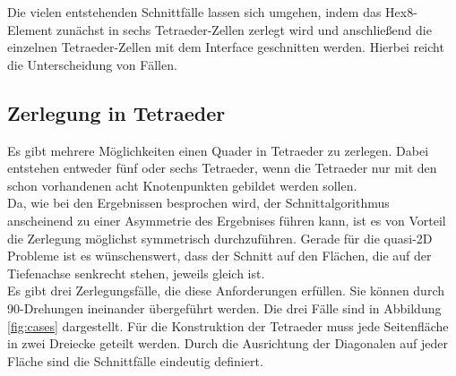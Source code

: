 Die vielen entstehenden Schnittfälle lassen sich umgehen, indem das Hex8-Element zunächst in sechs Tetraeder-Zellen zerlegt wird und anschließend die einzelnen Tetraeder-Zellen mit dem Interface geschnitten werden. Hierbei reicht die Unterscheidung von %
Fällen.

\subsection{Zerlegung in Tetraeder}
Es gibt mehrere Möglichkeiten einen Quader in Tetraeder zu zerlegen. Dabei entstehen entweder fünf oder sechs Tetraeder, wenn die Tetraeder nur mit den schon vorhandenen acht Knotenpunkten gebildet werden sollen.\\

Da, wie bei den Ergebnissen besprochen wird, der Schnittalgorithmus anscheinend zu einer Asymmetrie des Ergebnises führen kann, ist es von Vorteil die Zerlegung möglichst symmetrisch durchzuführen. Gerade für die quasi-2D Probleme ist es wünschenswert, dass der Schnitt auf den Flächen, die auf der Tiefenachse senkrecht stehen, jeweils gleich ist.\\

Es gibt drei Zerlegungsfälle, die diese Anforderungen erfüllen. Sie können durch 90\textdegree-Drehungen ineinander übergeführt werden. Die drei Fälle sind in Abbildung \ref{fig:cases} dargestellt. Für die Konstruktion der Tetraeder muss jede Seitenfläche in zwei Dreiecke geteilt werden. Durch die Ausrichtung der Diagonalen auf jeder Fläche sind die Schnittfälle eindeutig definiert.\\

